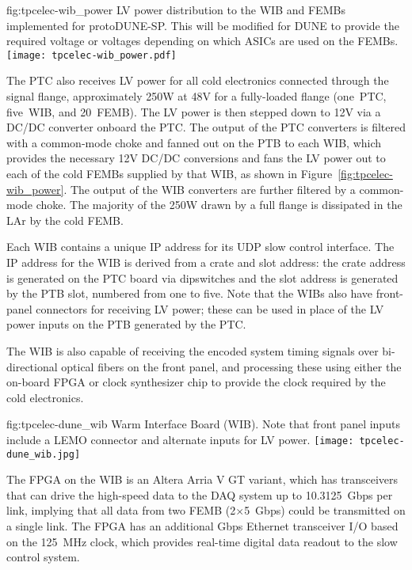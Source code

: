 \begin{dunefigure}
{fig:tpcelec-wib_power}
{LV power distribution to the WIB and FEMBs implemented for protoDUNE-SP. This will be modified for DUNE to provide the required voltage or voltages depending on which ASICs are used on the FEMBs.}
\texttt{[image: tpcelec-wib\_power.pdf]}
\end{dunefigure}

The PTC also receives LV power for all cold
electronics connected through the signal flange, approximately 250W at 48V for a
fully-loaded flange (one~PTC, five~WIB, and 20~FEMB). The LV power is then stepped down
to 12V via a DC/DC converter onboard the PTC. The output of the PTC converters is filtered with a common-mode choke and fanned out
on the PTB to each WIB, which provides the necessary 12V DC/DC conversions and fans
the LV power out to each of the cold FEMBs supplied by that WIB, 
as shown in Figure~\ref{fig:tpcelec-wib_power}. The output of the WIB converters are further filtered by a common-mode choke. The 
majority of the 250W drawn by a full flange is dissipated in the LAr
by the cold FEMB.

Each WIB contains a 
unique IP address for its UDP slow control interface. The IP address for the WIB is 
derived from a crate and slot address: the crate address is generated on the PTC 
board via dipswitches and the slot address is generated by the PTB slot, numbered 
from one to five. Note that the WIBs also have front-panel
connectors for receiving LV power; these can be used in place of 
the LV power inputs on the PTB generated by the PTC.

The WIB is also capable of
receiving the encoded system timing signals over bi-directional optical
fibers on the front panel, and processing these using either
the on-board FPGA or clock synthesizer chip to provide the clock required by the cold electronics.  

\begin{dunefigure}
{fig:tpcelec-dune_wib}
{Warm Interface Board (WIB). Note that front panel inputs include a LEMO connector and alternate inputs for LV power.}
\texttt{[image: tpcelec-dune\_wib.jpg]}
\end{dunefigure}

The FPGA on the WIB is an Altera Arria V GT variant, which has
transceivers that can drive the high-speed data to the DAQ system up to
10.3125~Gbps per link, implying that all data from
two FEMB (2$\times$5~Gbps) could be transmitted on a single link.
The FPGA has an additional Gbps Ethernet transceiver I/O based on the 125~MHz clock, which 
provides real-time digital data readout to the slow control system.
